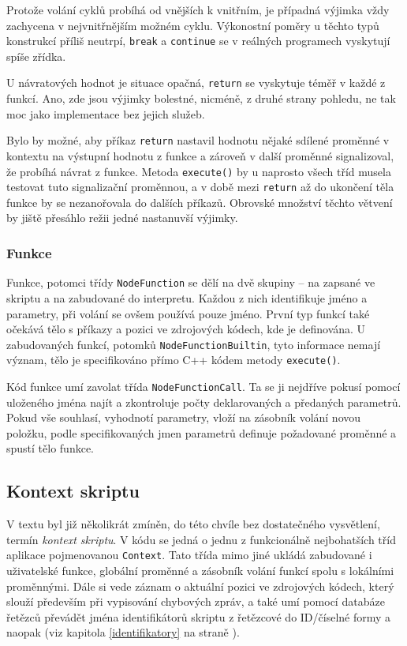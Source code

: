 \documentclass[11pt,twoside,a4paper]{book}
\begin{document}
Protože volání cyklů probíhá od vnějších k vnitřním, je případná výjimka vždy zachycena v nejvnitřnějším možném cyklu. Výkonostní poměry u těchto typů konstrukcí příliš neutrpí, \texttt{break} a \texttt{continue} se v reálných programech vyskytují spíše zřídka.

U návratových hodnot je situace opačná, \texttt{return} se vyskytuje téměř v každé z funkcí. Ano, zde jsou výjimky bolestné, nicméně, z druhé strany pohledu, ne tak moc jako implementace bez jejich služeb.

Bylo by možné, aby příkaz \texttt{return} nastavil hodnotu nějaké sdílené proměnné v kontextu na výstupní hodnotu z funkce a zároveň v další proměnné signalizoval, že probíhá návrat z funkce. Metoda \texttt{execute()} by u naprosto všech tříd musela testovat tuto signalizační proměnnou, a v době mezi \texttt{return} až do ukončení těla funkce by se nezanořovala do dalších příkazů. Obrovské množství těchto větvení by jiště přesáhlo režii jedné nastanuvší výjimky.


\subsubsection{Funkce}

Funkce, potomci třídy \texttt{NodeFunction} se dělí na dvě skupiny -- na zapsané ve skriptu a na zabudované do interpretu. Každou z nich identifikuje jméno a parametry, při volání se ovšem používá pouze jméno. První typ funkcí také očekává tělo s příkazy a pozici ve zdrojových kódech, kde je definována. U zabudovaných funkcí, potomků \texttt{Node\-Function\-Builtin}, tyto informace nemají význam, tělo je specifikováno přímo C++ kódem metody \texttt{execute()}.

Kód funkce umí zavolat třída \texttt{NodeFunctionCall}. Ta se ji nejdříve pokusí pomocí uloženého jména najít a zkontroluje počty deklarovaných a předaných parametrů. Pokud vše souhlasí, vyhodnotí parametry, vloží na zásobník volání novou položku, podle specifikovaných jmen parametrů definuje požadované proměnné a spustí tělo funkce.


\subsection{Kontext skriptu}

V textu byl již několikrát zmíněn, do této chvíle bez dostatečného vysvětlení, termín \textit{kontext skriptu}. V kódu se jedná o jednu z funkcionálně nejbohatších tříd aplikace pojmenovanou \texttt{Context}. Tato třída mimo jiné ukládá zabudované i uživatelské funkce, globální proměnné a zásobník volání funkcí spolu s lokálními proměnnými. Dále si vede záznam o aktuální pozici ve zdrojových kódech, který slouží především při vypisování chybových zpráv, a také umí pomocí databáze řetězců převádět jména identifikátorů skriptu z řetězcové do ID/číselné formy a naopak (viz kapitola \ref{identifikatory} na straně \pageref{identifikatory}).
\end{document}
